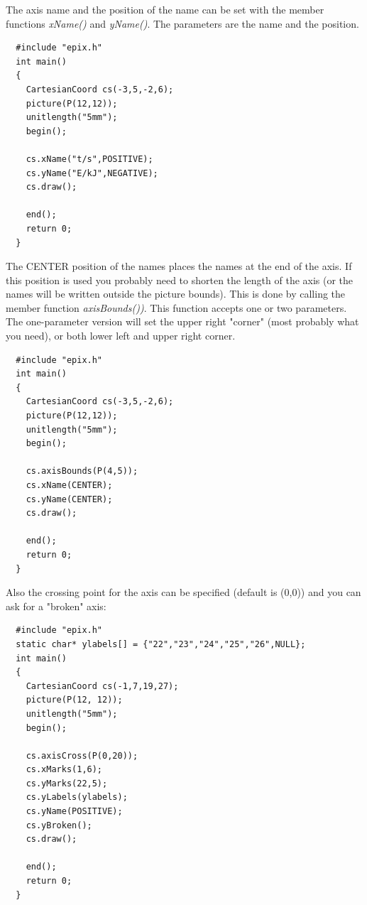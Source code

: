 \documentclass[12pt,a4paper]{article}
\begin{document}
  The axis name and the position of the name can be set with the member
  functions \textit{xName()} and \textit{yName()}. The parameters are the
  name and the position.%

  \begin{minipage}{7.5cm}
    \begin{lstlisting}
  #include "epix.h"
  int main()
  {
    CartesianCoord cs(-3,5,-2,6);
    picture(P(12,12));
    unitlength("5mm");
    begin();

    cs.xName("t/s",POSITIVE);
    cs.yName("E/kJ",NEGATIVE);
    cs.draw();

    end();
    return 0;
  }
    \end{lstlisting}
  \end{minipage}
  \begin{minipage}{5.5cm}
    
  \end{minipage}

  The CENTER position of the names places the names at the end of the axis. If
  this position is used you probably need to shorten the length of the axis (or
  the names will be written outside the picture bounds). This is done by calling
  the member function \textit{axisBounds())}. This function accepts one or two
  parameters. The one-parameter version will set the upper right "corner" (most
  probably what you need), or both lower left and upper right corner.

  \begin{minipage}{7.5cm}
    \begin{lstlisting}
  #include "epix.h"
  int main()
  {
    CartesianCoord cs(-3,5,-2,6);
    picture(P(12,12));
    unitlength("5mm");
    begin();

    cs.axisBounds(P(4,5));
    cs.xName(CENTER);
    cs.yName(CENTER);
    cs.draw();

    end();
    return 0;
  }
    \end{lstlisting}
  \end{minipage}
  \begin{minipage}{5.5cm}
    
  \end{minipage}

  Also the crossing point for the axis can be specified (default is (0,0))
  and you can ask for a "broken" axis:

  \begin{minipage}{7.5cm}
    \begin{lstlisting}
  #include "epix.h"
  static char* ylabels[] = {"22","23","24","25","26",NULL};
  int main()
  {
    CartesianCoord cs(-1,7,19,27);
    picture(P(12, 12));
    unitlength("5mm");
    begin();

    cs.axisCross(P(0,20));
    cs.xMarks(1,6);
    cs.yMarks(22,5);
    cs.yLabels(ylabels);
    cs.yName(POSITIVE);
    cs.yBroken();
    cs.draw();

    end();
    return 0;
  }
    \end{lstlisting}
  \end{minipage}
  \begin{minipage}{5.5cm}
    \vspace{1.0cm}
    
  \end{minipage}
\end{document}
